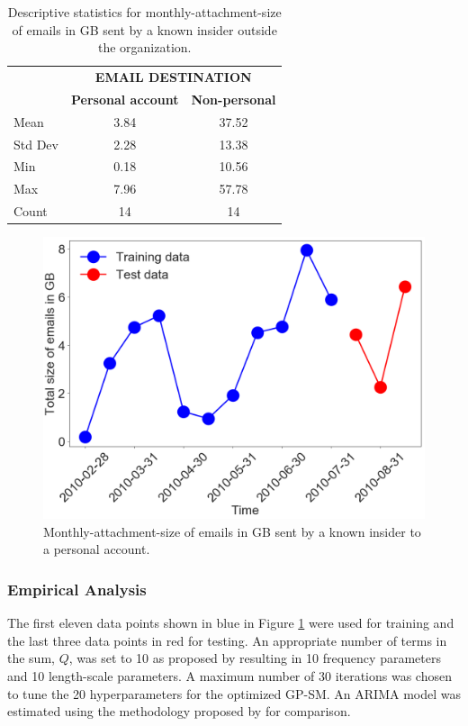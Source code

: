 \documentclass[letterpaper]{article}
\begin{document}
\begin{table}[h]
\caption{Descriptive statistics for monthly-attachment-size of emails in GB sent by a known insider outside the organization.}
\label{tab:descriptive-stats-emails}
\begin{center}
\begin{tabular}{l@{\qquad}cc}
  \toprule
  \multirow{2}{*}{\raisebox{-\heavyrulewidth}{\bf STATISTIC}} & \multicolumn{2}{c}{\bf EMAIL DESTINATION} \\
  \cmidrule{2-3}
  & {\bf Personal account} & {\bf Non-personal} \\
  \midrule
  Mean & 3.84 & 37.52  \\
  Std Dev & 2.28 & 13.38  \\
  Min & 0.18 & 10.56  \\
  Max & 7.96 & 57.78  \\
  Count & 14 & 14  \\
  \bottomrule
\end{tabular}
\end{center}
\end{table}

\begin{figure}[h]
\begin{center}
\includegraphics[width=\linewidth]{figures/data-emails2.png}
\caption{Monthly-attachment-size of emails in GB sent by a known insider to a personal account.}
\label{fig:data-emails}
\end{center}
\end{figure}

\subsubsection{Empirical Analysis}
The first eleven data points shown in blue in Figure \ref{fig:data-emails} were used for training and the last three data points in red for testing. An appropriate number of terms in the sum, $Q$, was set to 10 as proposed by \cite{wilson2015human} resulting in 10 frequency parameters and 10 length-scale parameters. A maximum number of 30 iterations was chosen to tune the 20 hyperparameters for the optimized GP-SM. An ARIMA model was estimated using the methodology proposed by \cite{veeramisti2016business} for comparison.
\end{document}
